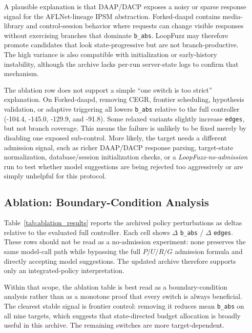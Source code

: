 \documentclass[final,5p,times,number]{elsarticle}
\begin{document}
A plausible explanation is that DAAP/DACP exposes a noisy or sparse response signal for the AFLNet-lineage IPSM abstraction. Forked-daapd contains media-library and control-session behavior where requests can change visible responses without exercising branches that dominate \texttt{b\_abs}. LoopFuzz may therefore promote candidates that look state-progressive but are not branch-productive. The high variance is also compatible with initialization or early-history instability, although the archive lacks per-run server-state logs to confirm that mechanism.

The ablation row does not support a simple ``one switch is too strict'' explanation. On Forked-daapd, removing CEGR, frontier scheduling, hypothesis validation, or adaptive triggering all lowers \texttt{b\_abs} relative to the full controller (-104.4, -145.0, -129.9, and -91.8). Some relaxed variants slightly increase \texttt{edges}, but not branch coverage. This means the failure is unlikely to be fixed merely by disabling one exposed sub-control. More likely, the target needs a different admission signal, such as richer DAAP/DACP response parsing, target-state normalization, database/session initialization checks, or a \emph{LoopFuzz-no-admission} run to test whether model suggestions are being rejected too aggressively or are simply unhelpful for this protocol.

\subsection{Ablation: Boundary-Condition Analysis}

Table~\ref{tab:ablation_results} reports the archived policy perturbations as deltas relative to the evaluated full controller. Each cell shows $\Delta$ \texttt{b\_abs} / $\Delta$ \texttt{edges}. These rows should not be read as a no-admission experiment: none preserves the same model-call path while bypassing the full $P/U/R/G$ admission formula and directly accepting model suggestions. The updated archive therefore supports only an integrated-policy interpretation.

Within that scope, the ablation table is best read as a boundary-condition analysis rather than as a monotone proof that every switch is always beneficial. The clearest stable signal is frontier control: removing it reduces mean \texttt{b\_abs} on all nine targets, which suggests that state-directed budget allocation is broadly useful in this archive. The remaining switches are more target-dependent.
\end{document}
